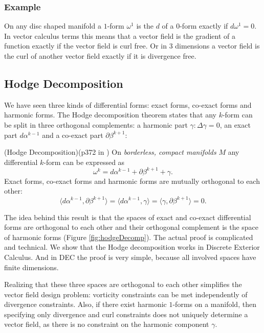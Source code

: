 \subsubsection{Example}
On any disc shaped manifold a $1$-form $\omega^1$ is the $d$ of a $0$-form exactly if $d\omega^1 = 0$. In vector calculus terms this means that a vector field is the gradient of a function exactly if the vector field is curl free. Or in 3 dimensions a vector field is the curl of another vector field exactly if it is divergence free.


\subsection{Hodge Decomposition}
\label{sec:VF_hodgeDecomp}

We have seen three kinds of differential forms: exact forms, co-exact forms and harmonic forms. 
The Hodge decomposition theorem states that any $k$-form can be split in three orthogonal complements: a harmonic part $\gamma: \Delta \gamma = 0$, an exact part $d\alpha^{k-1}$ and a co-exact part $\partial \beta^{k+1}$:
\begin{thm}(Hodge Decomposition)(p372 in \cite{FRANKEL11})
On \emph{borderless, compact manifolds} $M$ any differential $k$-form can be expressed as
\[\omega^k = d\alpha^{k-1} + \partial \beta^{k+1} + \gamma.\]
Exact forms, co-exact forms and harmonic forms are mutually orthogonal to each other:
\[\langle d \alpha^{k-1}, \partial \beta^{k+1}\rangle = \langle d \alpha^{k-1}, \gamma\rangle = \langle \gamma, \partial \beta^{k+1}\rangle =0.\]
\end{thm}

The idea  behind this result is that the spaces of exact and co-exact differential forms are orthogonal to each other and their orthogonal complement is the space of harmonic forms (Figure \ref{fig:hodgeDecomp}). The actual proof is complicated and technical.
We show that the Hodge decomposition works in Discrete Exterior Calculus. And in DEC the proof is very simple, because all involved spaces have finite dimensions. 

Realizing that these three spaces are orthogonal to each other simplifies the vector field design problem: vorticity constraints can be met independently of divergence constraints.
Also, if there exist harmonic $1$-forms on a manifold, then specifying only divergence and curl constraints does not uniquely determine a vector field, as there is no constraint on the harmonic component $\gamma$.

